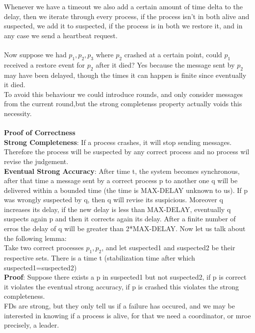 \documentclass[11pt, a4paper]{article}
\begin{document}
Whenever we have a timeout we also add a certain amount of time delta to the delay, then we iterate through every process, if the process isn't in both alive and suspected, we add it to suspected, if the process is in both we restore it, and in any case we send a heartbeat request.\\\\
Now suppose we had $p_1,p_2,p_3$ where $p_2$ crashed at a certain point, could $p_1$ received a restore event for $p_2$ after it died? Yes because the message sent by $p_2$ may have been delayed, though the times it can happen is finite since eventually it died.\\
To avoid this behaviour we could introduce rounds, and only consider messages from the current round,but the strong completenss property actually voids this necessity.\\\\
\textbf{Proof of Correctness}\\
\textbf{Strong Completeness}: If a process crashes, it will stop sending messages. Therefore the process will be suspected by any correct process and no process wil revise the judgement.\\
\textbf{Eventual Strong Accuracy}: After time t, the system becomes synchronous, after that time a message sent by a correct process p to another one q will be delivered within a bounded time (the time is MAX-DELAY unknown to us). If p was wrongly suspected by q, then q will revise its
 suspicious. Moreover q increases its delay, if the new delay is less than MAX-DELAY, eventually q suspects again p and then it corrects again its delay. After a finite number of erros the delay of q will be greater than 2*MAX-DELAY.
Now let us talk about the following lemma:\\
Take two correct processes $p_1,p_2$, and let suspected1 and suspected2 be their respective sets. There is a time t (stabilization time after which suspected1=suspected2)\\
\textbf{Proof}: Suppose there exists a p in suspected1 but not suspected2, if p is correct it violates the eventual strong accuracy, if p is crashed this violates the strong completeness.\\
FDs are strong, but they only tell us if a failure has occured, and we may be interested in knowing if a process is alive, for that we need a coordinator, or mroe precisely, a leader.\\
\end{document}
